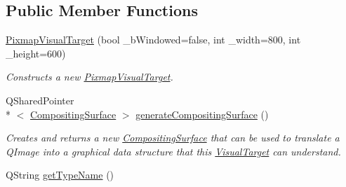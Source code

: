 \subsection*{Public Member Functions}
\begin{DoxyCompactItemize}
\item 
\hyperlink{struct_picto_1_1_pixmap_visual_target_a3d7badfb82ab0b409950197f2284a129}{Pixmap\-Visual\-Target} (bool \-\_\-b\-Windowed=false, int \-\_\-width=800, int \-\_\-height=600)
\begin{DoxyCompactList}\small\item\em Constructs a new \hyperlink{struct_picto_1_1_pixmap_visual_target}{Pixmap\-Visual\-Target}. \end{DoxyCompactList}\item 
Q\-Shared\-Pointer\\*
$<$ \hyperlink{struct_picto_1_1_compositing_surface}{Compositing\-Surface} $>$ \hyperlink{struct_picto_1_1_pixmap_visual_target_a22447d36b31e40ecb6f5ad13f20a5eb4}{generate\-Compositing\-Surface} ()
\begin{DoxyCompactList}\small\item\em Creates and returns a new \hyperlink{struct_picto_1_1_compositing_surface}{Compositing\-Surface} that can be used to translate a Q\-Image into a graphical data structure that this \hyperlink{class_picto_1_1_visual_target}{Visual\-Target} can understand. \end{DoxyCompactList}\item 
\hypertarget{struct_picto_1_1_pixmap_visual_target_a307b27dc2b7556abbacd067ac66d5750}{Q\-String \hyperlink{struct_picto_1_1_pixmap_visual_target_a307b27dc2b7556abbacd067ac66d5750}{get\-Type\-Name} ()}\label{struct_picto_1_1_pixmap_visual_target_a307b27dc2b7556abbacd067ac66d5750}


\end{DoxyCompactItemize}
